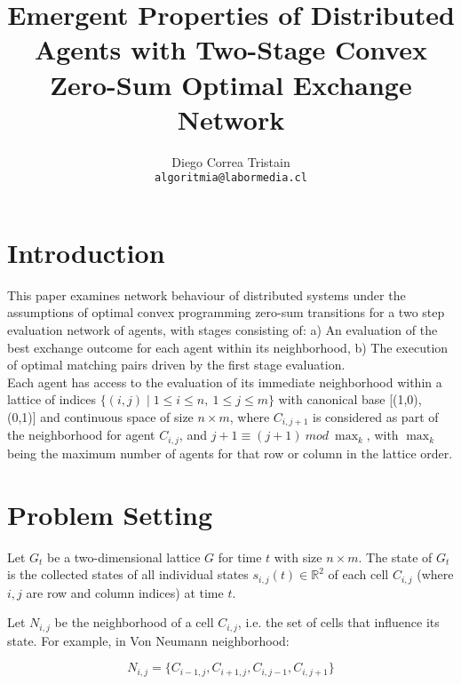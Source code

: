 \documentclass[12pt]{article}
\title{Emergent Properties of Distributed Agents with Two-Stage Convex Zero-Sum Optimal Exchange Network}
\author{Diego Correa Tristain \\ \texttt{algoritmia@labormedia.cl}}
\begin{document}
\pagestyle{empty}

\maketitle

\section{Introduction}
This paper examines network behaviour of distributed systems under the assumptions of optimal convex programming zero-sum transitions for a two step evaluation network of agents, with stages consisting of: \newline
a) An evaluation of the best exchange outcome for each agent within its neighborhood, \newline
b) The execution of optimal matching pairs driven by the first stage evaluation.\\
Each agent has access to the evaluation of its immediate neighborhood within a lattice of indices $\{(i, j) \mid 1 \leq i \leq n, \ 1 \leq j \leq m\}$ with canonical base [(1,0), (0,1)] and continuous space of size \(n \times m\), where $C_{i, j+1}$ is considered as part of the neighborhood for agent $C_{i, j}$, and $j + 1 \equiv (j + 1)\ mod\ \max_k$, with $\max_k$ being the maximum number of agents for that row or column in the lattice order.

\section{Problem Setting}
Let \(G_{t}\) be a two-dimensional lattice \(G\) for time \(t\) with size \(n \times m\). The state of \(G_{t}\) is the collected states of all individual states \(s_{i,j}(t) \in \mathbb{R}^2\) of each cell \(C_{i,j}\) (where \(i, j\) are row and column indices) at time \(t\).
  
Let \(N_{i,j}\) be the neighborhood of a cell \(C_{i,j}\), i.e. the set of cells that influence its state. For example, in Von Neumann neighborhood:

  \[
  N_{i,j} = \{C_{i-1,j}, C_{i+1,j}, C_{i,j-1}, C_{i,j+1}\} \tag{2.1}%
  \] 
  
\end{document}
